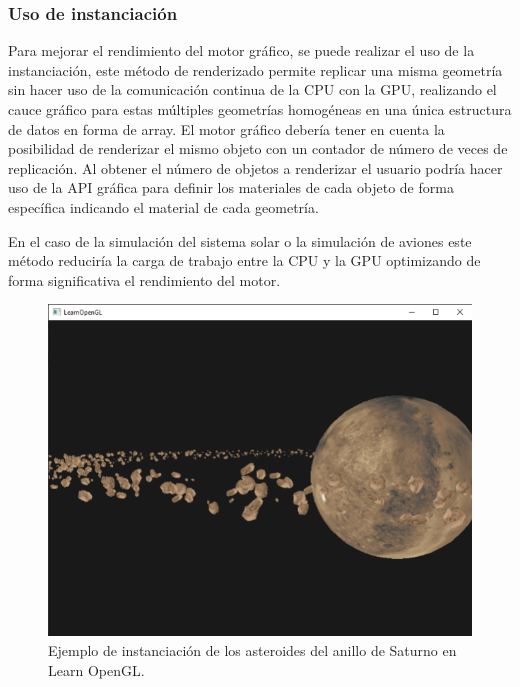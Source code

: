\documentclass[a4paper, 17pt]{book}
\begin{document}
\subsubsection{Uso de instanciación}

Para mejorar el rendimiento del motor gráfico, se puede realizar el uso de la instanciación, este método de renderizado
permite replicar una misma geometría sin hacer uso de la comunicación continua de la CPU con la GPU, realizando el cauce
gráfico para estas múltiples geometrías homogéneas en una única estructura de datos en forma de array. El motor gráfico
debería tener en cuenta la posibilidad de renderizar el mismo objeto con un contador de número de veces de replicación.
Al obtener el número de objetos a renderizar el usuario podría hacer uso de la API gráfica para definir los materiales
de cada objeto de forma específica indicando el material de cada geometría.

\vspace{1mm} %

En el caso de la simulación del sistema solar o la simulación de aviones este método reduciría la carga de trabajo entre
la CPU y la GPU optimizando de forma significativa el rendimiento del motor.

\begin{figure}[H]
    \centering
    \includegraphics[scale=0.40, keepaspectratio]{img/instanciacint_asteroids.png}
    \caption{Ejemplo de instanciación de los asteroides del anillo de Saturno en Learn OpenGL.}
    \label{figura:materialesBlender}
\end{figure}
\end{document}
